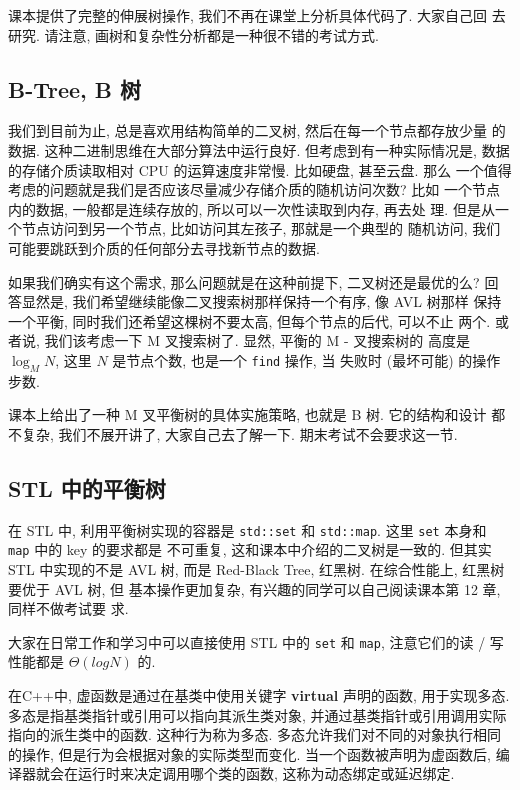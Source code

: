 \documentclass[a4paper]{ctexart}
\theoremstyle{definition}
\theoremstyle{definition}
\begin{document}
课本提供了完整的伸展树操作, 我们不再在课堂上分析具体代码了. 大家自己回
去研究. 请注意, 画树和复杂性分析都是一种很不错的考试方式.

\subsection{B-Tree, B 树}
我们到目前为止, 总是喜欢用结构简单的二叉树, 然后在每一个节点都存放少量
的数据. 这种二进制思维在大部分算法中运行良好. 但考虑到有一种实际情况是,
数据的存储介质读取相对 CPU 的运算速度非常慢. 比如硬盘, 甚至云盘. 那么
一个值得考虑的问题就是我们是否应该尽量减少存储介质的随机访问次数? 比如
一个节点内的数据, 一般都是连续存放的, 所以可以一次性读取到内存, 再去处
理. 但是从一个节点访问到另一个节点, 比如访问其左孩子, 那就是一个典型的
随机访问, 我们可能要跳跃到介质的任何部分去寻找新节点的数据.

如果我们确实有这个需求, 那么问题就是在这种前提下, 二叉树还是最优的么?
回答显然是, 我们希望继续能像二叉搜索树那样保持一个有序, 像 AVL 树那样
保持一个平衡, 同时我们还希望这棵树不要太高, 但每个节点的后代, 可以不止
两个. 或者说, 我们该考虑一下 M 叉搜索树了. 显然, 平衡的 M - 叉搜索树的
高度是 $\log_M N$, 这里 $N$ 是节点个数, 也是一个 \verb|find| 操作, 当
失败时 (最坏可能) 的操作步数. 

课本上给出了一种 M 叉平衡树的具体实施策略, 也就是 B 树. 它的结构和设计
都不复杂, 我们不展开讲了, 大家自己去了解一下. 期末考试不会要求这一节.

\subsection{STL 中的平衡树}

在 STL 中, 利用平衡树实现的容器是 \verb|std::set| 和
\verb|std::map|. 这里 \verb|set| 本身和 \verb|map| 中的 key 的要求都是
不可重复, 这和课本中介绍的二叉树是一致的. 但其实 STL 中实现的不是 AVL
树, 而是 Red-Black Tree, 红黑树. 在综合性能上, 红黑树要优于 AVL 树, 但
基本操作更加复杂, 有兴趣的同学可以自己阅读课本第 12 章, 同样不做考试要
求.

大家在日常工作和学习中可以直接使用 STL 中的 \verb|set| 和 \verb|map|,
注意它们的读 / 写性能都是 $\Theta(log N)$ 的.

在C++中, 虚函数是通过在基类中使用关键字 {\bfseries virtual} 声明的函数, 用于实现多态. 
多态是指基类指针或引用可以指向其派生类对象, 并通过基类指针或引用调用实际指向的派生类中的函数. 
这种行为称为多态. 多态允许我们对不同的对象执行相同的操作, 但是行为会根据对象的实际类型而变化.
当一个函数被声明为虚函数后, 编译器就会在运行时来决定调用哪个类的函数, 这称为动态绑定或延迟绑定. 
\end{document}
